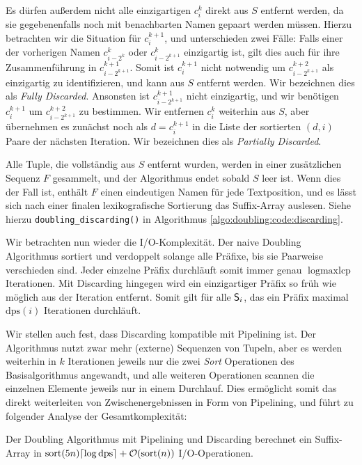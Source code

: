 Es dürfen außerdem nicht alle einzigartigen $c_i^k$ direkt aus $S$ entfernt werden, da sie gegebenenfalls noch mit benachbarten Namen gepaart werden müssen. Hierzu betrachten wir die Situation für $c_i^{k+1}$, und unterschieden zwei Fälle: Falls einer der vorherigen Namen $c_{i - 2^k}^k$ oder $c_{i - 2^{k+1}}^k$ einzigartig ist, gilt dies auch für ihre Zusammenführung in $c_{i - 2^{k+1}}^{k+1}$. Somit ist $c_i^{k+1}$ nicht notwendig um $c_{i - 2^{k+1}}^{k+2}$ als einzigartig zu identifizieren, und kann aus $S$ entfernt werden. Wir bezeichnen dies als \textit{Fully Discarded}. Ansonsten ist $c_{i - 2^{k+1}}^{k+1}$ nicht einzigartig, und wir benötigen $c_i^{k+1}$ um $c_{i - 2^{k+1}}^{k+2}$ zu bestimmen. Wir entfernen $c_i^k$ weiterhin aus $S$, aber übernehmen es zunächst noch als $d = c_i^{k+1}$ in die Liste der sortierten $(d, i)$ Paare der nächsten Iteration. Wir bezeichnen dies als \textit{Partially Discarded}.

Alle Tuple, die vollständig aus $S$ entfernt wurden, werden in einer zusätzlichen Sequenz $F$ gesammelt, und der Algorithmus endet sobald $S$ leer ist. Wenn dies der Fall ist, enthält $F$ einen eindeutigen Namen für jede Textposition, und es lässt sich nach einer finalen lexikografische Sortierung das Suffix-Array auslesen. Siehe hierzu \texttt{doubling\_discarding()} in Algorithmus \ref{algo:doubling:code:discarding}.

Wir betrachten nun wieder die I/O-Komplexität. Der naive Doubling Algorithmus sortiert und verdoppelt solange alle Präfixe, bis sie Paarweise verschieden sind. Jeder einzelne Präfix durchläuft somit immer genau $\log \text{maxlcp}$ Iterationen. Mit Discarding hingegen wird ein einzigartiger Präfix so früh wie möglich aus der Iteration entfernt. Somit gilt für alle $\mathsf{S}_{i}$, das ein Präfix maximal $\text{dps}(i)$ Iterationen durchläuft.

Wir stellen auch fest, dass Discarding kompatible mit Pipelining ist. Der Algorithmus nutzt zwar mehr (externe) Sequenzen von Tupeln, aber es werden weiterhin in $k$ Iterationen jeweils nur die zwei \textit{Sort} Operationen des Basisalgorithmus angewandt, und alle weiteren Operationen scannen die einzelnen Elemente jeweils nur in einem Durchlauf. Dies ermöglicht somit das direkt weiterleiten von Zwischenergebnissen in Form von Pipelining, und führt zu folgender Analyse der Gesamtkomplexität:

\begin{theorem}
Der Doubling Algorithmus mit Pipelining und Discarding berechnet ein Suffix-Array in $\text{sort}(5n) \ceil*{\log \text{dps}} +  \mathcal{O}(\text{sort}(n))$ I/O-Operationen.
\end{theorem}

